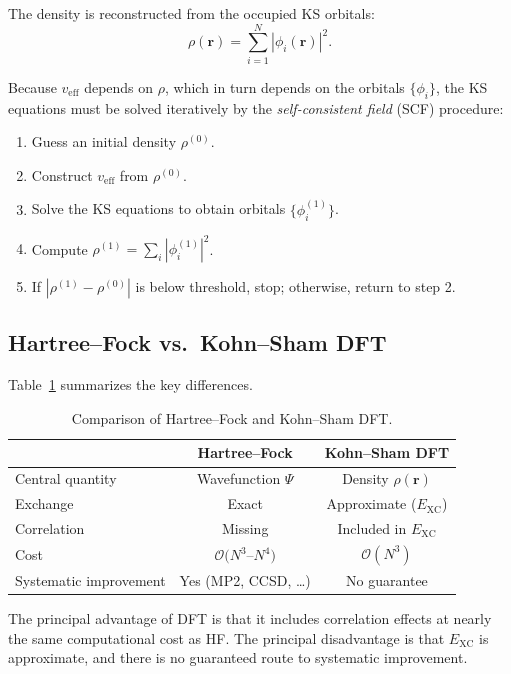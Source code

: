 \documentclass[11pt]{article}
\numberwithin{equation}{section}
\begin{document}
The density is reconstructed from the occupied KS orbitals:
\begin{equation}
\rho(\mathbf{r}) = \sum_{i=1}^{N}|\phi_i(\mathbf{r})|^2.
\end{equation}

Because $v_\text{eff}$ depends on $\rho$, which in turn depends on the orbitals $\{\phi_i\}$, the KS equations must be solved iteratively by the \emph{self-consistent field} (SCF) procedure:
\begin{enumerate}
\item Guess an initial density $\rho^{(0)}$.
\item Construct $v_\text{eff}$ from $\rho^{(0)}$.
\item Solve the KS equations to obtain orbitals $\{\phi_i^{(1)}\}$.
\item Compute $\rho^{(1)} = \sum_i |\phi_i^{(1)}|^2$.
\item If $|\rho^{(1)} - \rho^{(0)}|$ is below threshold, stop; otherwise, return to step 2.
\end{enumerate}

\subsection{Hartree--Fock vs.\ Kohn--Sham DFT}

Table~\ref{tab:HFvsDFT} summarizes the key differences.

\begin{table}[h]
\centering
\caption{Comparison of Hartree--Fock and Kohn--Sham DFT.}
\label{tab:HFvsDFT}
\begin{tabular}{lcc}
\toprule
& \textbf{Hartree--Fock} & \textbf{Kohn--Sham DFT} \\
\midrule
Central quantity & Wavefunction $\Psi$ & Density $\rho(\mathbf{r})$ \\
Exchange & Exact & Approximate ($E_\text{XC}$) \\
Correlation & Missing & Included in $E_\text{XC}$ \\
Cost & $\mathcal{O}(N^3$--$N^4)$ & $\mathcal{O}(N^3)$ \\
Systematic improvement & Yes (MP2, CCSD, \ldots) & No guarantee \\
\bottomrule
\end{tabular}
\end{table}

The principal advantage of DFT is that it includes correlation effects at nearly the same computational cost as HF. The principal disadvantage is that $E_\text{XC}$ is approximate, and there is no guaranteed route to systematic improvement.
\end{document}
